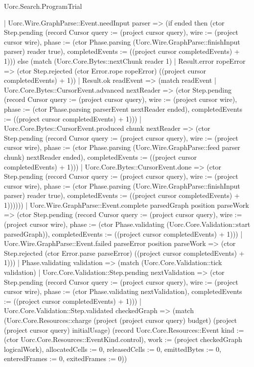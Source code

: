 \begin{lexlean}{Uorc.Search.ProgramTrial}
\begin{semanticmodule}
{      | Uorc.Wire.GraphParse::Event.needInput parser => (if ended then (ctor Step.pending (record Cursor {query := (project cursor query), wire := (project cursor wire), phase := (ctor Phase.parsing (Uorc.Wire.GraphParse::finishInput parser) reader true), completedEvents := ((project cursor completedEvents) + 1)})) else (match (Uorc.Core.Bytes::nextChunk reader 1)
        | Result.error ropeError => (ctor Step.rejected (ctor Error.rope ropeError) ((project cursor completedEvents) + 1))
        | Result.ok readEvent => (match readEvent
          | Uorc.Core.Bytes::CursorEvent.advanced nextReader => (ctor Step.pending (record Cursor {query := (project cursor query), wire := (project cursor wire), phase := (ctor Phase.parsing parserEvent nextReader ended), completedEvents := ((project cursor completedEvents) + 1)}))
          | Uorc.Core.Bytes::CursorEvent.produced chunk nextReader => (ctor Step.pending (record Cursor {query := (project cursor query), wire := (project cursor wire), phase := (ctor Phase.parsing (Uorc.Wire.GraphParse::feed parser chunk) nextReader ended), completedEvents := ((project cursor completedEvents) + 1)}))
          | Uorc.Core.Bytes::CursorEvent.done => (ctor Step.pending (record Cursor {query := (project cursor query), wire := (project cursor wire), phase := (ctor Phase.parsing (Uorc.Wire.GraphParse::finishInput parser) reader true), completedEvents := ((project cursor completedEvents) + 1)})))))
      | Uorc.Wire.GraphParse::Event.complete parsedGraph position parseWork => (ctor Step.pending (record Cursor {query := (project cursor query), wire := (project cursor wire), phase := (ctor Phase.validating (Uorc.Core.Validation::start parsedGraph)), completedEvents := ((project cursor completedEvents) + 1)}))
      | Uorc.Wire.GraphParse::Event.failed parseError position parseWork => (ctor Step.rejected (ctor Error.parse parseError) ((project cursor completedEvents) + 1)))
    | Phase.validating validation => (match (Uorc.Core.Validation::tick validation)
      | Uorc.Core.Validation::Step.pending nextValidation => (ctor Step.pending (record Cursor {query := (project cursor query), wire := (project cursor wire), phase := (ctor Phase.validating nextValidation), completedEvents := ((project cursor completedEvents) + 1)}))
      | Uorc.Core.Validation::Step.validated checkedGraph => (match (Uorc.Core.Resources::charge (project (project cursor query) budget) (project (project cursor query) initialUsage) (record Uorc.Core.Resources::Event {kind := (ctor Uorc.Core.Resources::EventKind.control), work := (project checkedGraph logicalWork), allocatedCells := 0, releasedCells := 0, emittedBytes := 0, enteredFrames := 0, exitedFrames := 0}))
}
\end{semanticmodule}
\end{lexlean}
